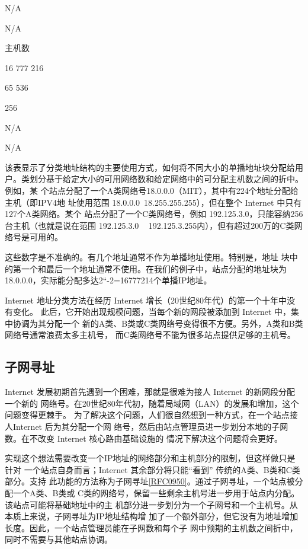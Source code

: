 N/A

N/A

主机数

16 777 216

65 536

256

N/A

N/A

该表显示了分类地址结构的主要使用方式，如何将不同大小的单播地址块分配给用
户。类划分基于给定大小的可用网络数和给定网络中的可分配主机数之间的折中。例如，某
个站点分配了一个A类网络号18.0.0.0（MIT），其中有224个地址分配给主机（即IPV4地
址使用范围 18.0.0.0~18.255.255.255），但在整个 Internet 中只有127个A类网络。某个
站点分配了一个C类网络号，例如 192.125.3.0，只能容纳256台主机（也就是说在范围
192.125.3.0 ~ 192.125.3.255内），但有超过200万的C类网络号是可用的。

\begin{tcolorbox}
    这些数字是不准确的。有几个地址通常不作为单播地址使用。特别是，地址
    块中的第一个和最后一个地址通常不使用。在我们的例子中，站点分配的地址块为
    18.0.0.0，实际能分配多达2“-2=16777214个单播IP地址。
\end{tcolorbox}

Internet 地址分类方法在经历 Internet 增长（20世纪80年代）的第一个十年中没有变化。
此后，它开始出现规模问题，当每个新的网段被添加到 Internet 中，集中协调为其分配一个
新的A类、B类或C类网络号变得很不方便。另外，A类和B类网络号通常浪费太多主机号，
而C类网络号不能为很多站点提供足够的主机号。

\subsection{子网寻址}
Internet 发展初期首先遇到一个困难，那就是很难为接人 Internet 的新网段分配一个新的
网络号。在20世纪80年代初，随着局域网（LAN）的发展和增加，这个问题变得更棘手。
为了解决这个问题，人们很自然想到一种方式，在一个站点接人Internet 后为其分配一个网
络号，然后由站点管理员进一步划分本地的子网数。在不改变 Internet 核心路由基础设施的
情况下解决这个问题将会更好。

实现这个想法需要改变一个IP地址的网络部分和主机部分的限制，但这样做只是针对
一个站点自身而言；Internet 其余部分将只能“看到” 传统的A类、B类和C类部分。支持
此功能的方法称为子网寻址\href{https://www.rfc-editor.org/rfc/rfc0950}{[RFC0950]}。通过子网寻址，一个站点被分配一个A类、B类或
C类的网络号，保留一些剩余主机号进一步用于站点内分配。该站点可能将基础地址中的主
机部分进一步划分为一个子网号和一个主机号。从本质上来说，子网寻址为IP地址结构增
加了一个额外部分，但它没有为地址增加长度。因此，一个站点管理员能在子网数和每个子
网中预期的主机数之间折中，同时不需要与其他站点协调。

